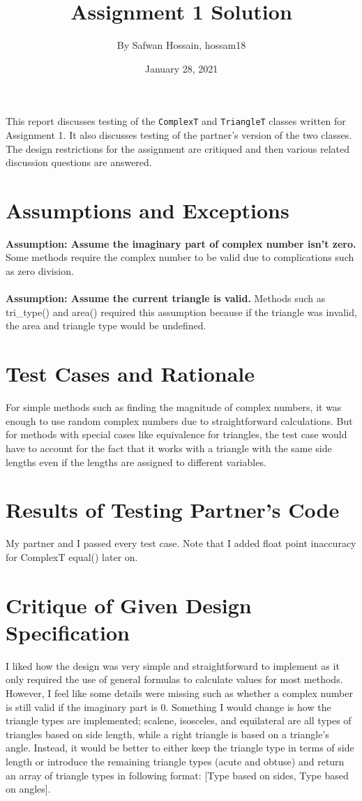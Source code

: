\documentclass[12pt]{article}
\title{Assignment 1 Solution}
\author{By Safwan Hossain, hossam18}
\date{January 28, 2021}
\begin{document}
\maketitle

This report discusses testing of the \verb|ComplexT| and \verb|TriangleT|
classes written for Assignment 1. It also discusses testing of the partner's
version of the two classes. The design restrictions for the assignment
are critiqued and then various related discussion questions are answered.

\section{Assumptions and Exceptions} \label{AssumptAndExcept}

\textbf{Assumption: Assume the imaginary part of complex number isn’t zero.} Some methods require the complex number to be valid due to complications such as zero division. \\ \\
\textbf{Assumption: Assume the current triangle is valid.} Methods such as tri\_type() and area() required this assumption because if the triangle was invalid, the area and triangle type would be undefined.

\section{Test Cases and Rationale} \label{Testing}

For simple methods such as finding the magnitude of complex numbers, it was enough to use random complex numbers due to straightforward calculations. But for methods with special cases like equivalence for triangles, the test case would have to account for the fact that it works with a triangle with the same side lengths even if the lengths are assigned to different variables. 

\section{Results of Testing Partner's Code}

My partner and I passed every test case. Note that I added float point inaccuracy for ComplexT equal() later on.

\section{Critique of Given Design Specification}
I liked how the design was very simple and straightforward to implement as it only required the use of general formulas to calculate values for most methods. However, I feel like some details were missing such as whether a complex number is still valid if the imaginary part is 0. Something I would change is how the triangle types are implemented; scalene, isosceles, and equilateral are all types of triangles based on side length, while a right triangle is based on a triangle's angle. Instead, it would be better to either keep the triangle type in terms of side length or introduce the remaining triangle types (acute and obtuse) and return an array of triangle types in following format: [Type based on sides, Type based on angles].
\end{document}
